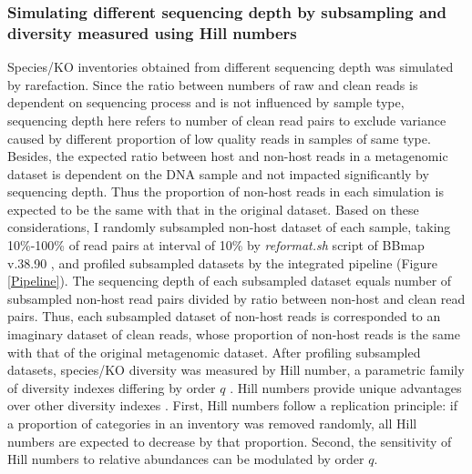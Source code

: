 \documentclass[11pt]{article}
\begin{document}
      \subsubsection{Simulating different sequencing depth by subsampling and diversity measured using Hill numbers}
      Species/KO inventories obtained from different sequencing depth was simulated by rarefaction. 
      Since the ratio between numbers of raw and clean reads is dependent on sequencing process and is not influenced by sample type, sequencing depth here refers to number of clean read pairs to exclude variance caused by different proportion of low quality reads in samples of same type. 
      Besides, the expected ratio between host and non-host reads in a metagenomic dataset is dependent on the DNA sample and not impacted significantly by sequencing depth. 
      Thus the proportion of non-host reads in each simulation is expected to be the same with that in the original dataset. 
      \newline
      Based on these considerations, I randomly subsampled non-host dataset of each sample, taking 10\%-100\% of read pairs at interval of 10\% by \textit{reformat.sh} script of BBmap v.38.90 \citep{bushnell2014bbmap}, and profiled subsampled datasets by the integrated pipeline (Figure \ref{Pipeline}). 
      The sequencing depth of each subsampled dataset equals number of subsampled non-host read pairs divided by ratio between non-host and clean read pairs. 
      Thus, each subsampled dataset of non-host reads is corresponded to an imaginary dataset of clean reads, whose proportion of non-host reads is the same with that of the original metagenomic dataset. 
      \newline
      After profiling subsampled datasets, species/KO diversity was measured by Hill number, a parametric family of diversity indexes differing by order $q$ \citep{hill1973diversity,ma2018measuring,roswell2021conceptual}. 
      Hill numbers provide unique advantages over other diversity indexes \citep{chao2014unifying,chao2014rarefaction,alberdi2019guide,roswell2021conceptual}. 
      First, Hill numbers follow a replication principle: if a proportion of categories in an inventory was removed randomly, all Hill numbers are expected to decrease by that proportion. 
      Second, the sensitivity of Hill numbers to relative abundances can be modulated by order $q$. 
\end{document}
